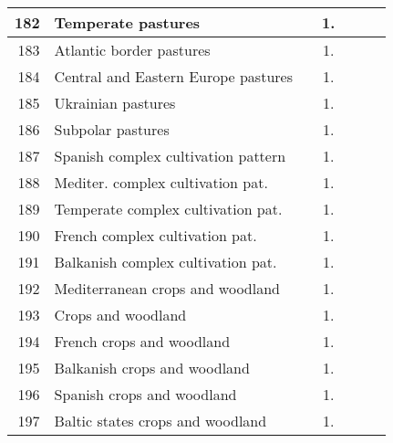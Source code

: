 {{\begin{tabular}{||r|l||c|c|c|c|c||}
 \hline
 \hline
         182  & Temperate pastures                                           &       &  1.   &       &       \\
 \hline
         183  & Atlantic border pastures                                     &       &  1.   &       &       \\
 \hline
         184  & Central and Eastern Europe pastures                          &       &  1.   &       &       \\
 \hline
         185  & Ukrainian pastures                                           &       &  1.   &       &       \\
 \hline
         186  & Subpolar pastures                                            &       &  1.   &       &       \\
 \hline
 \hline
         187  & Spanish complex cultivation pattern                          &       &  1.   &       &       \\
 \hline
         188  & Mediter. complex cultivation pat.                            &       &  1.   &       &       \\
 \hline
         189  & Temperate complex cultivation pat.                           &       &  1.   &       &       \\
 \hline
         190  & French complex cultivation pat.                              &       &  1.   &       &       \\
 \hline
         191  & Balkanish complex cultivation pat.                           &       &  1.   &       &       \\
 \hline
 \hline
         192  & Mediterranean crops and woodland                             &       &  1.   &       &       \\
 \hline
         193  & Crops and woodland                                           &       &  1.   &       &       \\
 \hline
         194  & French crops and woodland                                    &       &  1.   &       &       \\
 \hline
         195  & Balkanish crops and woodland                                 &       &  1.   &       &       \\
 \hline
         196  & Spanish crops and woodland                                   &       &  1.   &       &       \\
 \hline
         197  & Baltic states crops and woodland                             &       &  1.   &       &       \\
 \hline
 \hline

\end{tabular}}}
